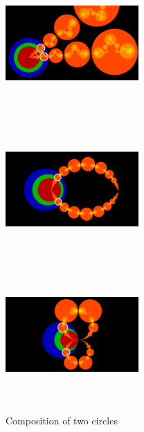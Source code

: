 \begin{figure}[htbp]
  \begin{minipage}[]{0.3\hsize}
   \center
   \includegraphics[width=2in, height=2in, keepaspectratio]{../img/klein/2diis/scaling.pdf}
   \label{fig:scaling2d}
  \end{minipage}
 \hspace*{\fill}
  \begin{minipage}[]{0.3\hsize}
   \center
   \includegraphics[width=2in, height=2in, keepaspectratio]{../img/klein/2diis/hyperbolic.pdf}
   \label{fig:hyperbolic2d}
  \end{minipage}
 \hspace*{\fill}
  \begin{minipage}[]{0.3\hsize}
   \center
   \includegraphics[width=2in, height=2in, keepaspectratio]{../img/klein/2diis/parabolic.pdf}
   \label{fig:parabolic2d}
  \end{minipage}
  \caption{Composition of two circles}
  \label{fig:twoCircles}
\end{figure}

